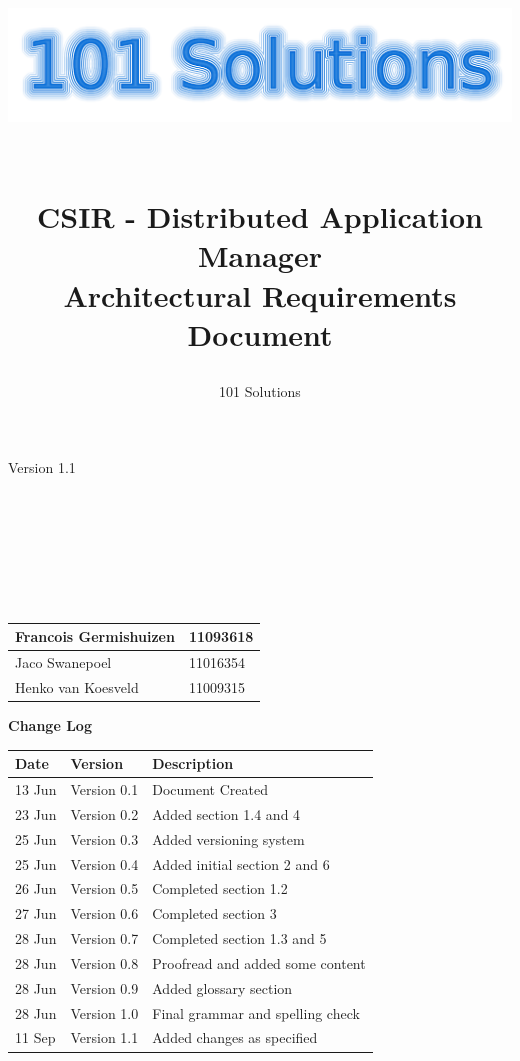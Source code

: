 \documentclass[a4paper,12pt,final]{article}
\title{
\begin{center}
  	\includegraphics[scale=0.3]{101Logo.png} 
  \end{center}
  \textbf{\\}
CSIR - Distributed Application Manager\\
Architectural Requirements Document\\
}
\author{101 Solutions}
\begin{document}
\maketitle
\begin{center}
Version 1.1
\end{center}
\textbf{\\}
\textbf{\\}
\textbf{\\}
\textbf{\\}
\textbf{\\}
\textbf{\\}
\begin{center}
\begin{tabular}{|l|l|}
\hline
Francois Germishuizen & 11093618\\
\hline
Jaco Swanepoel & 11016354\\
\hline
Henko van Koesveld & 11009315\\
\hline
\end{tabular}
\end{center}
\thispagestyle{empty}
\newpage
\thispagestyle{empty}
\textbf{\large{Change Log}}
\vspace{6pt}\newline
\begin{tabular}{|l|l|l|}
\hline
Date & Version & Description\\
\hline
13 Jun & Version 0.1 & Document Created\\
\hline
23 Jun & Version 0.2 & Added section 1.4 and 4\\
\hline
25 Jun & Version 0.3 & Added versioning system\\
\hline
25 Jun & Version 0.4 & Added initial section 2 and 6\\
\hline
26 Jun & Version 0.5 & Completed section 1.2\\
\hline
27 Jun & Version 0.6 & Completed section 3\\
\hline
28 Jun & Version 0.7 & Completed section 1.3 and 5\\
\hline
28 Jun & Version 0.8 & Proofread and added some content\\
\hline
28 Jun & Version 0.9 & Added glossary section\\
\hline
28 Jun & Version 1.0 & Final grammar and spelling check\\
\hline
11 Sep & Version 1.1 & Added changes as specified\\
\hline
\end{tabular}
\newpage
\tableofcontents
\thispagestyle{empty}
\newpage
\end{document}

